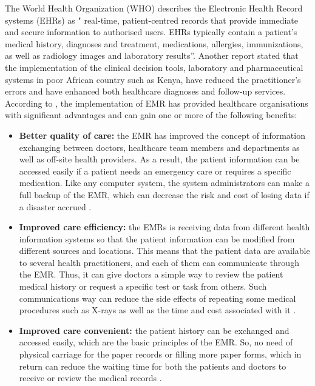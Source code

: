
%
%
The World Health Organization (WHO) \cite{WorldHealthOrganization2016} describes the Electronic Health Record systems (EHRs) as " real-time, patient-centred records that provide immediate and secure information to authorised users. EHRs typically contain a patient's medical history, diagnoses and treatment, medications, allergies, immunizations, as well as radiology images and laboratory results”. Another report \cite{WorldHealthOrganization2013} stated that the implementation of the clinical decision tools, laboratory and pharmaceutical systems in poor African country such as Kenya, have reduced the practitioner's errors and have enhanced both healthcare diagnoses and follow-up services. According to \cite{OfHealth}, the implementation of EMR has provided healthcare organisations with significant advantages and can gain one or more of the following benefits:
\begin{itemize}
	\item \textbf{Better quality of care:} the EMR has improved the concept of information exchanging between doctors, healthcare team members and departments as well as off-site health providers. As a result, the patient information can be accessed easily if a patient needs an emergency care or requires a specific medication. Like any computer system, the system administrators can make a full backup of the EMR, which can decrease the risk and cost of losing data if a disaster accrued \cite{OfHealth}.
	\item \textbf{Improved care efficiency:} the EMRs is receiving data from different health information systems so that the patient information can be modified from different sources and locations. This means that the patient data are available to several health practitioners, and each of them can communicate through the EMR. Thus, it can give doctors a simple way to review the patient medical history or request a specific test or task from others. Such communications way can reduce the side effects of repeating some medical procedures such as X-rays as well as the time and cost associated with it   \cite{OfHealth}. 
	\item \textbf{Improved care convenient:} the patient history can be exchanged and accessed easily, which are the basic principles of the EMR. So, no need of physical carriage for the paper records or filling more paper forms, which in return can reduce the waiting time for both the patients and doctors to receive or review the medical records  \cite{OfHealth}.
\end{itemize}

